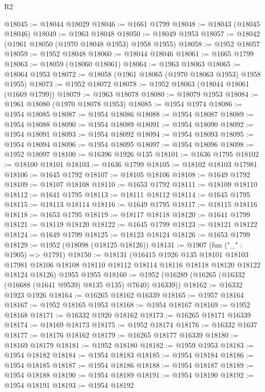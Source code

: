\begin{lexlean}{R2}
\begin{coremodule}
@18045 := @18044 @18029
@18046 := @1661 @1799
@18048 := @18043 (@18045 @18046)
@18049 := @1963 @18048
@18050 := @18049 @1953
@18057 := @18042 (@1961 @18050 (@1970 @18048 @1953) @1958 @1955)
@18058 := @1952 @18057
@18059 := @1952 @18048
@18060 := @18044 @18046
@18061 := @1665 @1799
@18063 := @18059 (@18060 @18061)
@18064 := @1963 @18063
@18065 := @18064 @1953
@18072 := @18058 (@1961 @18065 (@1970 @18063 @1953) @1958 @1955)
@18073 := @1952 @18072
@18078 := @1952 @18063 (@18044 @18061 (@1669 @1799))
@18079 := @1963 @18078
@18080 := @18079 @1953
@18084 := @1961 @18080 (@1970 @18078 @1953)
@18085 := @1954 @1974
@18086 := @1954 @18085
@18087 := @1954 @18086
@18088 := @1954 @18087
@18089 := @1954 @18088
@18090 := @1954 @18089
@18091 := @1954 @18090
@18092 := @1954 @18091
@18093 := @1954 @18092
@18094 := @1954 @18093
@18095 := @1954 @18094
@18096 := @1954 @18095
@18097 := @1954 @18096
@18098 := @1952 @18097
@18100 := @16396 @1926 @135
@18101 := @1636 @1795
@18102 := @18100 @18101
@18103 := @1636 @1799
@18105 := @18102 @18103 @17981
@18106 := @1645 @1792
@18107 := @18105 @18106
@18108 := @1649 @1792
@18109 := @18107 @18108
@18110 := @1653 @1792
@18111 := @18109 @18110
@18112 := @1641 @1795
@18113 := @18111 @18112
@18114 := @1645 @1795
@18115 := @18113 @18114
@18116 := @1649 @1795
@18117 := @18115 @18116
@18118 := @1653 @1795
@18119 := @18117 @18118
@18120 := @1641 @1799
@18121 := @18119 @18120
@18122 := @1645 @1799
@18123 := @18121 @18122
@18124 := @1649 @1799
@18125 := @18123 @18124
@18126 := @1653 @1799
@18129 := @1952 (@18098 (@18125 @18126))
@18131 := @1907 (fun ("_" : @1905) => @1791)
@18150 := @18131
    (@16415
      @1926
      @135
      @18101
      @18103
      @17981
      @18106
      @18108
      @18110
      @18112
      @18114
      @18116
      @18118
      @18120
      @18122
      @18124
      @18126)
    @1955
    @1955
@18160 := @1952 (@16289 (@16265 (@16332 (@16688 (@1641 @9539) @8135 @135) @7640) @16339))
@18162 := @16332 @1923 @1926
@18164 := @16265 @18162 @16339
@18165 := @1957 @18164
@18167 := @1952 @18165 @1953
@18168 := @1954 @18167
@18169 := @1952 @18168
@18171 := @16332 @1920 @18162
@18173 := @16265 @18171 @16339
@18174 := @18169 @18173
@18175 := @1952 @18174
@18176 := @16332 @1637
@18177 := @18176 @18162
@18179 := @16265 @18177 @16339
@18180 := @18169 @18179
@18181 := @1952 @18180
@18182 := @1959 @1953
@18183 := @1954 @18182
@18184 := @1954 @18183
@18185 := @1954 @18184
@18186 := @1954 @18185
@18187 := @1954 @18186
@18188 := @1954 @18187
@18189 := @1954 @18188
@18190 := @1954 @18189
@18191 := @1954 @18190
@18192 := @1954 @18191
@18193 := @1954 @18192

\end{coremodule}
\end{lexlean}
